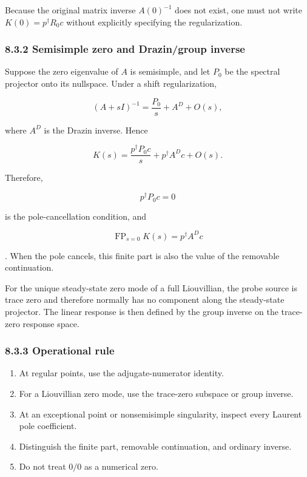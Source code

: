 \documentclass[
  10pt,
  a4paper,
]{article}
\providecommand{\tightlist}{%
  \setlength{\itemsep}{0pt}\setlength{\parskip}{0pt}}
\begin{document}
Because the original matrix inverse \(A(0)^{-1}\) does not exist, one
must not write \(K(0)=p^\dagger R_0c\) without explicitly specifying the
regularization.

\subsubsection{8.3.2 Semisimple zero and Drazin/group
inverse}\label{semisimple-zero-and-drazingroup-inverse}

Suppose the zero eigenvalue of \(A\) is semisimple, and let \(P_0\) be
the spectral projector onto its nullspace. Under a shift regularization,

\[
(A+sI)^{-1}
=\frac{P_0}{s}+A^D+O(s),
\]

where \(A^D\) is the Drazin inverse. Hence

\[
K(s)
=\frac{p^\dagger P_0c}{s}
+p^\dagger A^Dc+O(s).
\]

Therefore,

\[
\boxed{p^\dagger P_0c=0}
\]

is the pole-cancellation condition, and

\[
\boxed{
\operatorname{FP}_{s=0}K(s)
=p^\dagger A^Dc
}
\]

. When the pole cancels, this finite part is also the value of the
removable continuation.

For the unique steady-state zero mode of a full Liouvillian, the probe
source is trace zero and therefore normally has no component along the
steady-state projector. The linear response is then defined by the group
inverse on the trace-zero response space.

\subsubsection{8.3.3 Operational rule}\label{operational-rule}

\begin{enumerate}
\def\labelenumi{\arabic{enumi}.}
\tightlist
\item
  At regular points, use the adjugate-numerator identity.
\item
  For a Liouvillian zero mode, use the trace-zero subspace or group
  inverse.
\item
  At an exceptional point or nonsemisimple singularity, inspect every
  Laurent pole coefficient.
\item
  Distinguish the finite part, removable continuation, and ordinary
  inverse.
\item
  Do not treat \(0/0\) as a numerical zero.
\end{enumerate}
\end{document}
